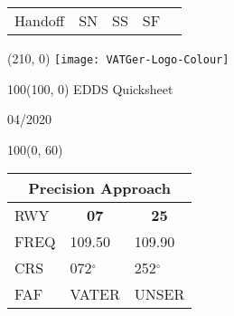 \documentclass[10pt,landscape,a4paper]{article}
\begin{document}
\begin{textblock}{30}
\begin{table}[]
\begin{tabular}{lcccccccccccccc}
\multicolumn{2}{|l}{Handoff}                                                                                              & \multicolumn{6}{r||}{SN}                                                                                                                                                                                                                                                                                                                                                                                                                                       & \multicolumn{4}{l|}{SS}                                                                                                                                                                                                                                                  & \multicolumn{2}{c|}{SF}                                                                                        & \multicolumn{1}{l}{}                                                 \\ \cline{1-14}
\end{tabular}
\end{table}
\end{textblock}

\begin{textblock}{2}(210, 0)
  \texttt{[image: VATGer-Logo-Colour]}
\end{textblock}


\begin{textblock}{100}(100, 0)
  \large
  \centering
  EDDS Quicksheet

  04/2020
\end{textblock}

\begin{textblock}{100}(0, 60)
\begin{table}[]
\begin{tabular}{lll}
\multicolumn{3}{c}{\textbf{Precision Approach}}                                                  \\ \hline
\multicolumn{1}{|l|}{RWY}  & \multicolumn{1}{c|}{\textbf{07}} & \multicolumn{1}{c|}{\textbf{25}} \\ \hline
\multicolumn{1}{|l|}{FREQ} & \multicolumn{1}{l|}{109.50}      & \multicolumn{1}{l|}{109.90}      \\
\multicolumn{1}{|l|}{CRS}  & \multicolumn{1}{l|}{072$^\circ$}         & \multicolumn{1}{l|}{252$^\circ$}         \\
\multicolumn{1}{|l|}{FAF}  & \multicolumn{1}{l|}{VATER}       & \multicolumn{1}{l|}{UNSER}       \\ \hline
\end{tabular}
\end{table}
\end{textblock}
\end{document}
